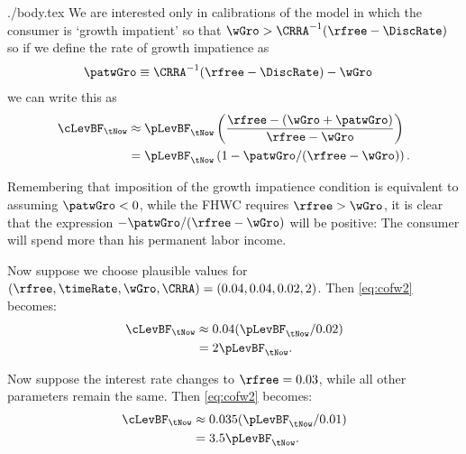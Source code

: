 \documentclass{handout}
\begin{document}
\begin{verbatimwrite}{./body.tex}
We are interested only in calibrations of the model in which the consumer is `growth impatient' so that $\wGro > \CRRA^{-1}(\rfree-\DiscRate)$ so if we define the rate of growth impatience as 
\begin{equation}\begin{gathered}\begin{aligned} \label{eq:patwGro}
\patwGro & \equiv  \CRRA^{-1}(\rfree-\DiscRate)-\wGro 
\end{aligned}\end{gathered}\end{equation}
we can write this as 
\begin{equation}\begin{gathered}\begin{aligned}
        \cLevBF_{\tNow} & \approx  \pLevBF_{\tNow} \left(\frac{\rfree - (\wGro+\patwGro)}{\rfree-\wGro}\right)
\\ & =  \pLevBF_{\tNow} \left(1 - \patwGro/(\rfree - \wGro)\right). \label{eq:CvsP}
\end{aligned}\end{gathered}\end{equation}

Remembering that imposition of the growth impatience condition is equivalent to assuming $\patwGro < 0$, while the FHWC requires $\rfree > \wGro$, it is clear that the expression $-\patwGro/(\rfree-\wGro)$ will be positive:  The consumer will spend more than his permanent labor income.

Now suppose we choose plausible values for $(\rfree, \timeRate, \wGro, \CRRA) = (0.04,0.04,0.02,2)$.
Then \eqref{eq:cofw2} becomes:
\begin{equation}\begin{gathered}\begin{aligned}
        \cLevBF_{\tNow} & \approx  0.04 (\pLevBF_{\tNow}/0.02) \\
         & =  2 \pLevBF_{\tNow}.
\end{aligned}\end{gathered}\end{equation}

Now suppose the interest rate changes to $\rfree=0.03$, while all other parameters
remain the same.  Then \eqref{eq:cofw2} becomes:
\begin{equation}\begin{gathered}\begin{aligned}
        \cLevBF_{\tNow} & \approx  0.035 (\pLevBF_{\tNow}/0.01)  \\
         & =  3.5 \pLevBF_{\tNow}.
\end{aligned}\end{gathered}\end{equation}


\end{verbatimwrite}
\end{document}
